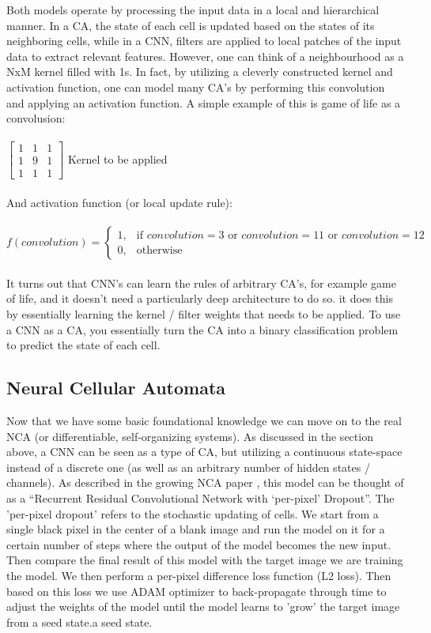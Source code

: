 Both models operate by processing the input data in a local and hierarchical manner. In a CA, the state of each cell is updated based on the states of its neighboring cells, while in a CNN, filters are applied to local patches of the input data to extract relevant features. However, one can think of a neighbourhood as a NxM kernel filled with 1s. In fact, by utilizing a cleverly constructed kernel and activation function, one can model many CA's by performing this convolution and applying an activation function. A simple example of this is game of life as a convolusion: \\ \\
$
\begin{bmatrix}
	1 & 1 & 1 \\
	1 & 9 & 1 \\
	1 & 1 & 1
\end{bmatrix}
$
Kernel to be applied \\ \\
And activation function (or local update rule): \\ \\
$
f(convolution) = \begin{cases}
	1, & \text{if } convolution = 3 \text{ or } convolution = 11 \text{ or } convolution = 12 \\
	0, & \text{otherwise}
\end{cases}
$ \\ \\

It turns out that CNN's can learn the rules of arbitrary CA's, for example game of life, and it doesn't need a particularly deep architecture to do so. it does this by essentially learning the kernel / filter weights that needs to be applied. To use a CNN as a CA, you essentially turn the CA into a binary classification problem to predict the state of each cell.

\subsection{Neural Cellular Automata}

Now that we have some basic foundational knowledge we can move on to the real NCA (or differentiable, self-organizing systems). As discussed in the section above, a CNN can be seen as a type of CA, but utilizing a continuous state-space instead of a discrete one (as well as an arbitrary number of hidden states / channels). As described in the growing NCA paper \cite{growing_nca}, this model can be thought of as a “Recurrent Residual Convolutional Network with ‘per-pixel’ Dropout”. The 'per-pixel dropout' refers to the stochastic updating of cells. We start from a single black pixel in the center of a blank image and run the model on it for a certain number of steps where the output of the model becomes the new input. Then compare the final result of this model with the target image we are training the model. We then perform a per-pixel difference loss function (L2 loss). Then based on this loss we use ADAM optimizer to back-propagate through time to adjust the weights of the model until the model learns to 'grow' the target image from a seed state.a seed state.
